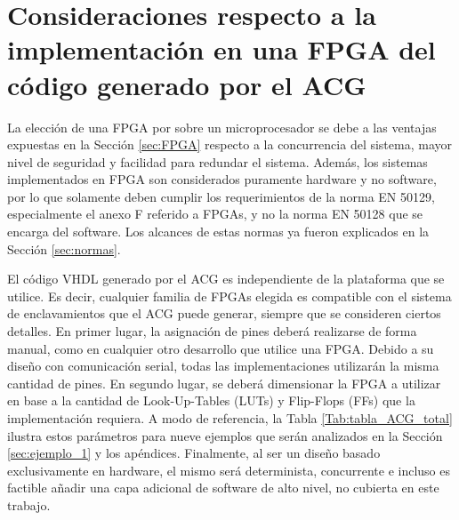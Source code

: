 \section{Consideraciones respecto a la implementación en una FPGA del código generado por el ACG}
	\label{sec:plataforma}
		
	La elección de una FPGA por sobre un microprocesador se debe a las ventajas expuestas en la Sección \ref{sec:FPGA} respecto a la concurrencia del sistema, mayor nivel de seguridad y facilidad para redundar el sistema. Además, los sistemas implementados en FPGA son considerados puramente hardware y no software, por lo que solamente deben cumplir los requerimientos de la norma EN 50129, especialmente el anexo F referido a FPGAs, y no la norma EN 50128 que se encarga del software. Los alcances de estas normas ya fueron explicados en la Sección \ref{sec:normas}.
	
	El código VHDL generado por el ACG es independiente de la plataforma que se utilice. Es decir, cualquier familia de FPGAs elegida es compatible con el sistema de enclavamientos que el ACG puede generar, siempre que se consideren ciertos detalles. En primer lugar, la asignación de pines deberá realizarse de forma manual, como en cualquier otro desarrollo que utilice una FPGA. Debido a su diseño con comunicación serial, todas las implementaciones utilizarán la misma cantidad de pines. En segundo lugar, se deberá dimensionar la FPGA a utilizar en base a la cantidad de Look-Up-Tables (LUTs) y Flip-Flops (FFs) que la implementación requiera. A modo de referencia, la Tabla \ref{Tab:tabla_ACG_total} ilustra estos parámetros para nueve ejemplos que serán analizados en la Sección \ref{sec:ejemplo_1} y los apéndices. Finalmente, al ser un diseño basado exclusivamente en hardware, el mismo será determinista, concurrente e incluso es factible añadir una capa adicional de software de alto nivel, no cubierta en este trabajo.
